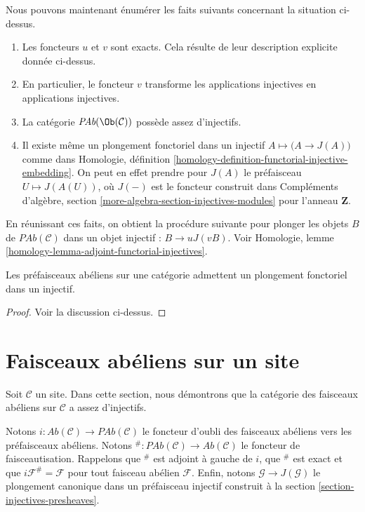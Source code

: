 \medskip\noindent
Nous pouvons maintenant énumérer les faits suivants concernant la situation
ci-dessus.
\begin{enumerate}
\item Les foncteurs $u$ et $v$ sont exacts. Cela résulte de leur description
explicite donnée ci-dessus.
\item En particulier, le foncteur $v$ transforme les applications injectives
en applications injectives.
\item La catégorie $\textit{PAb}(\Ob(\mathcal{C}))$ possède assez d'injectifs.
\item Il existe même un plongement fonctoriel dans un injectif
$A \mapsto \big(A \to J(A)\big)$ comme dans
Homologie, définition \ref{homology-definition-functorial-injective-embedding}.
On peut en effet prendre pour $J(A)$ le préfaisceau
$U\mapsto J(A(U))$, où $J(-)$ est le foncteur construit dans
Compléments d'algèbre, section
\ref{more-algebra-section-injectives-modules}
pour l'anneau $\mathbf{Z}$.
\end{enumerate}
En réunissant ces faits, on obtient la procédure suivante pour plonger les
objets $B$ de $\textit{PAb}(\mathcal{C})$ dans un objet injectif :
$B \to uJ(vB)$. Voir
Homologie, lemme \ref{homology-lemma-adjoint-functorial-injectives}.

\begin{proposition}
\label{proposition-presheaves-injectives}
Les préfaisceaux abéliens sur une catégorie admettent un plongement fonctoriel
dans un injectif.
\end{proposition}

\begin{proof}
Voir la discussion ci-dessus.
\end{proof}

\section{Faisceaux abéliens sur un site}
\label{section-injectives-sheaves}

\noindent
Soit $\mathcal{C}$ un site. Dans cette section, nous démontrons que la
catégorie des faisceaux abéliens sur $\mathcal{C}$ a assez d'injectifs.

\medskip\noindent
Notons
$i : \textit{Ab}(\mathcal{C}) \longrightarrow \textit{PAb}(\mathcal{C})$
le foncteur d'oubli des faisceaux abéliens vers les préfaisceaux abéliens.
Notons
${}^\# : \textit{PAb}(\mathcal{C}) \longrightarrow \textit{Ab}(\mathcal{C})$
le foncteur de faisceautisation. Rappelons que ${}^\#$ est adjoint à gauche
de $i$, que ${}^\#$ est exact et que $i\mathcal{F}^\# = \mathcal{F}$
pour tout faisceau abélien $\mathcal{F}$. Enfin, notons
$\mathcal{G} \to J(\mathcal{G})$ le plongement canonique dans un
préfaisceau injectif construit à la
section \ref{section-injectives-presheaves}.

